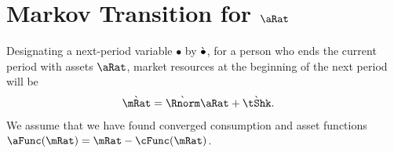 \documentclass[\econtexRoot/BufferStockTheory.tex]{subfiles}
\begin{document}
\pagebreak


\section{Markov Transition for $\aRat$}

\begin{comment}
  Our derivations will be for consumers who are living in the `true' economy.  In that economy, the transition equation for $\aRat$ is:
  \subsection{Transition for $\aRat$}
  \begin{equation}\begin{gathered}\begin{aligned}
    \aRat_{\tAbs+1} & = \Rfree (\PGro \pShk_{\tAbs+1})^{-1} \aRat_{\tAbs} + \tShk_{\tAbs+1} - \cFunc_{\tAbs+1}(\Rfree (\PGro \pShk_{\tAbs+1})^{-1}\aRat_{\tAbs}+\tShk_{\tAbs+1})
    \\                \Nxt{_{\tAbs+1}^{\aRat}(\aRat_{\tAbs+1}) & = \CDF_{\tAbs+1}^{\aRat}\left(\Rfree (\PGro \pShk_{\tAbs+1})^{-1} \aRat_{\tAbs} + \tShk_{\tAbs+1} - \cFunc_{\tAbs+1}(\Rfree (\PGro \pShk_{\tAbs+1})^{-1}\aRat_{\tAbs}+\tShk_{\tAbs+1})\right)
  \end{aligned}\end{gathered}\end{equation}
\end{comment}

Designating a next-period variable $\bullet$ by $\grave{\bullet}$, for a person who ends the current period with assets $\pnt$, market resources at the beginning of the next period will be
\begin{equation}\begin{gathered}\begin{aligned}
  \Nxt{\mRat} & = \Nxt{\Rnorm}\pnt+\Nxt{\tShk}.
\end{aligned}\end{gathered}\end{equation}
We assume that we have found converged consumption and asset functions $\aFunc(\mRat)=\mRat-\cFunc(\mRat)$.  
\end{document}

